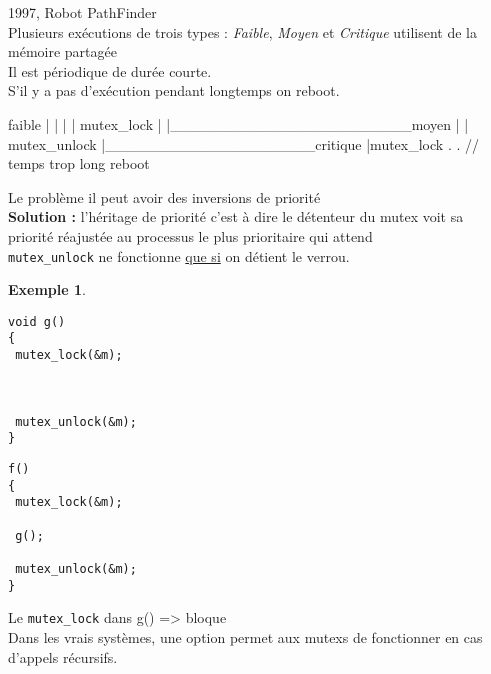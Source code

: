\documentclass[12pt,a4paper]{report}
\newtheorem*{ex}{Exemple}
\begin{document}
1997, Robot PathFinder\\
Plusieurs exécutions de trois types : \emph{Faible}, \emph{Moyen} et \emph{Critique} utilisent de la mémoire partagée\\
Il est périodique de durée courte.\\
S'il y a pas d'exécution pendant longtemps on reboot.

\begin{verbatimtab}
faible
  |
  |
  |
  |
mutex_lock
  |
  |_______________________moyen
                            |
                            |
mutex_unlock                |____________________critique
                                                    |mutex_lock
													.
													.      // temps trop long
												reboot
\end{verbatimtab}

Le problème il peut avoir des inversions de priorité\\
\textbf{Solution :} l'héritage de priorité c'est à dire le détenteur du mutex voit sa priorité réajustée au processus le plus prioritaire qui attend\\






\verb?mutex_unlock? ne fonctionne \underline{que si} on détient le verrou.

\begin{ex}
\end{ex}
\medskip
\begin{minipage}{0.5\linewidth}
\begin{verbatim}
void g()
{
 mutex_lock(&m);

 
 
 mutex_unlock(&m);
}
\end{verbatim}
\end{minipage}
\begin{minipage}{0.5\linewidth}
\begin{verbatim}
f()
{
 mutex_lock(&m);
 
 g();
 
 mutex_unlock(&m);
}
\end{verbatim}
\end{minipage}

\bigskip

Le \verb?mutex_lock? dans g() => bloque\\
Dans les vrais systèmes, une option permet aux mutexs de fonctionner en cas d'appels récursifs.\\
\end{document}
